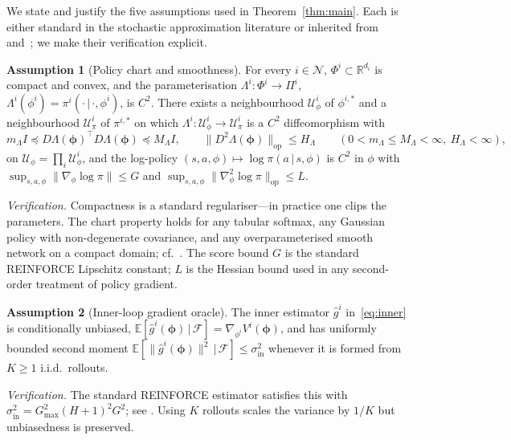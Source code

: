 \documentclass[11pt]{article}
\theoremstyle{definition}
\newtheorem{assumption}{Assumption}
\theoremstyle{remark}
\newcommand{\N}{\mathcal{N}}
\newcommand{\E}{\mathbb{E}}
\newcommand{\R}{\mathbb{R}}
\newcommand{\given}{\,\vert\,}
\begin{document}
We state and justify the five assumptions used in
Theorem~\ref{thm:main}.  Each is either standard in the stochastic
approximation literature or inherited from~\citet{giannou2022convergence}
and~\citet{kim2021meta}; we make their verification explicit.

\begin{assumption}[Policy chart and smoothness]\label{ass:chart}
For every $i\in\N$, $\Phi^i\subset\R^{d_i}$ is compact and convex, and
the parameterisation $\Lambda^i:\Phi^i\to\Pi^i$,
$\Lambda^i(\phi^i)=\pi^i(\cdot\given\cdot,\phi^i)$, is $C^2$.  There
exists a neighbourhood $\mathcal U_\phi^i$ of $\phi^{i,*}$ and a
neighbourhood $\mathcal U_\pi^i$ of $\pi^{i,*}$ on which
$\Lambda^i:\mathcal U_\phi^i\to\mathcal U_\pi^i$ is a $C^2$
diffeomorphism with
\[
  m_\Lambda I\preceq D\Lambda(\bm\phi)^\top D\Lambda(\bm\phi)\preceq M_\Lambda I,\qquad
  \|D^2\Lambda(\bm\phi)\|_{\mathrm{op}}\le H_\Lambda\qquad(0<m_\Lambda\le M_\Lambda<\infty,\ H_\Lambda<\infty),
\]
on $\mathcal U_\phi=\prod_i\mathcal U_\phi^i$, and the log-policy
$(s,a,\phi)\mapsto\log\pi(a\given s,\phi)$ is $C^2$ in $\phi$ with
$\sup_{s,a,\phi}\|\nabla_\phi\log\pi\|\le G$ and
$\sup_{s,a,\phi}\|\nabla_\phi^2\log\pi\|_{\mathrm{op}}\le L$.
\end{assumption}

\emph{Verification.}  Compactness is a standard regulariser---in
practice one clips the parameters.  The chart property holds for any
tabular softmax, any Gaussian policy with non-degenerate covariance,
and any overparameterised smooth network on a compact domain;
cf.~\citep{agarwal2021theory}.  The score bound $G$ is the standard
REINFORCE Lipschitz constant; $L$ is the Hessian bound used in any
second-order treatment of policy gradient.

\begin{assumption}[Inner-loop gradient oracle]\label{ass:oracle}
The inner estimator $\hat g^i$ in~\eqref{eq:inner} is conditionally
unbiased, $\E[\hat g^i(\bm\phi)\given\mathcal F]=\nabla_{\phi^i}V^i(\bm\phi)$,
and has uniformly bounded second moment
$\E[\|\hat g^i(\bm\phi)\|^2\given\mathcal F]\le\sigma_{\mathrm{in}}^2$
whenever it is formed from $K\ge 1$ i.i.d.\ rollouts.
\end{assumption}

\emph{Verification.}  The standard REINFORCE estimator satisfies this
with $\sigma_{\mathrm{in}}^2=G_{\max}^2(H+1)^2G^2$; see
\citep[Ch.~13]{sutton2018reinforcement}.  Using $K$ rollouts scales the
variance by $1/K$ but unbiasedness is preserved.
\end{document}
